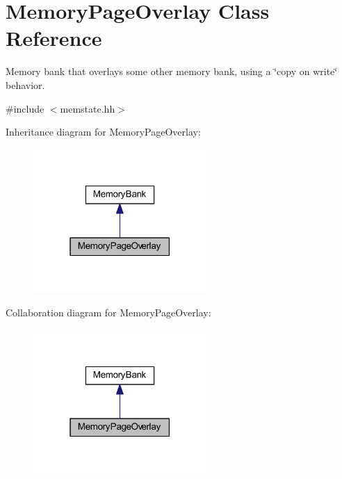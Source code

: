 \hypertarget{class_memory_page_overlay}{}\section{Memory\+Page\+Overlay Class Reference}
\label{class_memory_page_overlay}


Memory bank that overlays some other memory bank, using a \char`\"{}copy on write\char`\"{} behavior.  




{\ttfamily \#include $<$memstate.\+hh$>$}



Inheritance diagram for Memory\+Page\+Overlay\+:
\nopagebreak
\begin{figure}[H]
\begin{center}
\leavevmode
\includegraphics[width=187pt]{class_memory_page_overlay__inherit__graph}
\end{center}
\end{figure}


Collaboration diagram for Memory\+Page\+Overlay\+:
\nopagebreak
\begin{figure}[H]
\begin{center}
\leavevmode
\includegraphics[width=187pt]{class_memory_page_overlay__coll__graph}
\end{center}
\end{figure}
